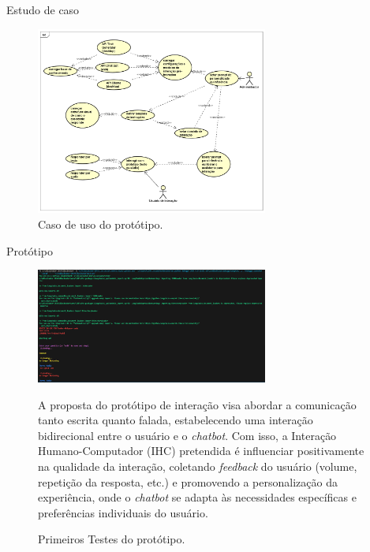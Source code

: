 \documentclass{beamer}
\begin{document}
\begin{frame}[allowframebreaks]{Estudo de caso}

\begin{figure}[!h]
\centering
\includegraphics[width=3in]{images/UseCase.png}
\caption{Caso de uso do protótipo.} 
\label{fig:Casodeuso}
\end{figure}

\end{frame}

\begin{frame}[allowframebreaks]{Protótipo}

\begin{figure}[!h]
\centering
\includegraphics[width=3in]{images/Prototipo test.png}
\caption{Primeiros Testes do protótipo.} 
A proposta do protótipo de interação visa abordar a comunicação tanto escrita quanto falada, estabelecendo uma interação bidirecional entre o usuário e o \textit{chatbot}. Com isso, a Interação Humano-Computador (IHC) pretendida é influenciar positivamente na qualidade da interação, coletando \textit{feedback} do usuário (volume, repetição da resposta, etc.) e promovendo a personalização da experiência, onde o \textit{chatbot} se adapta às necessidades específicas e preferências individuais do usuário.
\label{fig:Prototipo}
\end{figure}

\end{frame}
\end{document}
